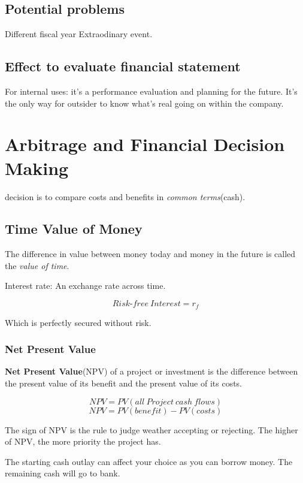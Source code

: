 \documentclass[10pt, a4paper]{article}
\begin{document}
    \subsection{Potential problems}
        Different fiscal year
        Extraodinary event. 
    
    \subsection{Effect to evaluate financial statement}
        For internal uses: it's a performance evaluation and planning for the future. 
        It's the only way for outsider to know what's real going on within the company.
        
    \section{Arbitrage and Financial Decision Making}
        decision is to compare costs and benefits in \emph{common terms}(cash).
        \subsection{Time Value of Money}
            The difference in value between money today and money in the future is called the \emph{value of time}.

            Interest rate: An exchange rate across time. 
            
            $$Risk\text{-}free\ Interest = r_f$$

            Which is perfectly secured without risk.  
            
            \subsubsection{Net Present Value}
                \textbf{Net Present Value}(NPV) of a project or investment is the difference between the present value of its benefit and the present value of its costs. 

                $$NPV = PV (all\ Project\ cash\ flows)$$
                $$NPV = PV(benefit) - PV(costs)$$
            
                The sign of NPV is the rule to judge weather accepting or rejecting. The higher of NPV, the more priority the project has. 

                The starting cash outlay can affect your choice as you can borrow money. The remaining cash will go  to bank. 
            
\end{document}
